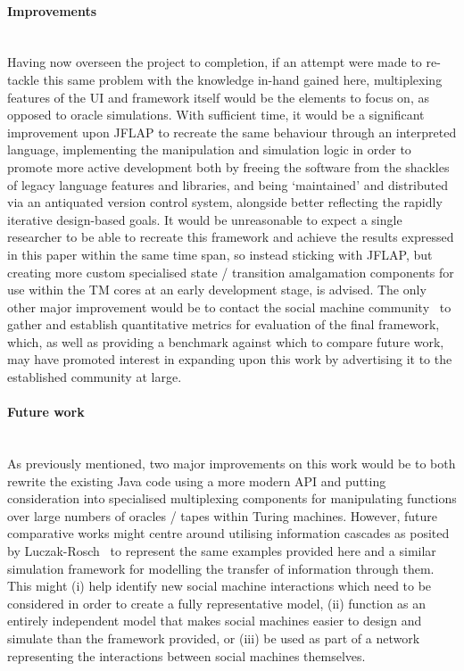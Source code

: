 \documentclass[12pt]{article}
\begin{document}
	\paragraph{Improvements}\hfill\\
		Having now overseen the project to completion, if an attempt were made to re-tackle this same problem with the knowledge in-hand gained here, multiplexing features of the UI and framework itself would be the elements to focus on, as opposed to oracle simulations.
		With sufficient time, it would be a significant improvement upon JFLAP to recreate the same behaviour through an interpreted language, implementing the manipulation and simulation logic in order to promote more active development both by freeing the software from the shackles of legacy language features and libraries, and being `maintained' and distributed via an antiquated version control system, alongside better reflecting the rapidly iterative design-based goals.
		It would be unreasonable to expect a single researcher to be able to recreate this framework and achieve the results expressed in this paper within the same time span, so instead sticking with JFLAP, but creating more custom specialised state / transition amalgamation components for use within the TM cores at an early development stage, is advised.
		The only other major improvement would be to contact the social machine community~\cite{sociam} to gather and establish quantitative metrics for evaluation of the final framework, which, as well as providing a benchmark against which to compare future work, may have promoted interest in expanding upon this work by advertising it to the established community at large.

	\clearpage
	\paragraph{Future work}\hfill\\
		As previously mentioned, two major improvements on this work would be to both rewrite the existing Java code using a more modern API and putting consideration into specialised multiplexing components for manipulating functions over large numbers of oracles / tapes within Turing machines.
		However, future comparative works might centre around utilising information cascades as posited by Luczak-Rosch~\cite{Luczak-Rosch2015} to represent the same examples provided here and a similar simulation framework for modelling the transfer of information through them.
		This might (i) help identify new social machine interactions which need to be considered in order to create a fully representative model, (ii) function as an entirely independent model that makes social machines easier to design and simulate than the framework provided, or (iii) be used as part of a network representing the interactions between social machines themselves.
		
\end{document}
